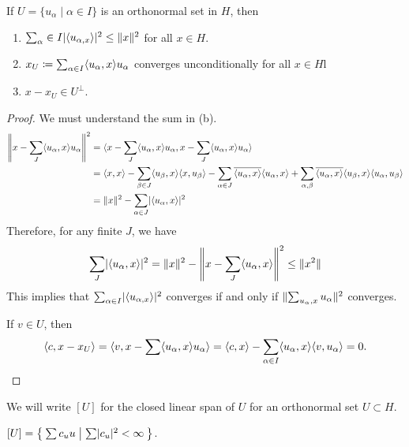 \documentclass[10pt, twoside]{article}
\begin{document}
    \begin{thm}[Bessel] If $U = \{u_{\alpha} \mid \alpha \in I\}$ is an
        orthonormal set in $H$, then \begin{enumerate}[label=(\alph*)] \item
            $\sum_{\alpha }\in I \abs{\gen{u_{\alpha,x}}}^2 \leq \norm{x}^2$
            for all $x \in H$.  \item $x_U \coloneqq \sum_{\alpha \in I}
            \gen{u_{\alpha},x} u_{\alpha}$ converges unconditionally for all $x
            \in H$l \item $x-x_U \in U^{\perp}$.  \end{enumerate}

        \begin{proof} We must understand the sum in (b).  \begin{align*}
            \norm*{x-\sum_J \gen{u_{\alpha},x} u_{\alpha}}^2 &= \gen{x-\sum_J
            \gen{u_{\alpha},x} u_{\alpha}, x-\sum_J \gen{u_{\alpha},x}
            u_{\alpha}} \\ &= \gen{x,x} - \sum_{\beta \in J}
            \gen{u_{\beta},x}\gen{x,u_{\beta}} - \sum_{\alpha \in J}
            \overline{\gen{u_{\alpha},x}} \gen{u_{\alpha},x} +
            \sum_{\alpha,\beta}
            \overline{\gen{u_{\alpha},x}}\gen{u_{\beta},x}\gen{u_{\alpha},u_{\beta}}
            \\ &= \norm{x}^2 - \sum_{\alpha \in J} \abs{\gen{u_{\alpha},x}}^2
            \end{align*} Therefore, for any finite $J$, we have \[\sum_J
        \abs{\gen{u_{\alpha},x}}^2 = \norm{x}^2 - \norm*{x - \sum_J
    \gen{u_{\alpha},x}}^2 \leq \norm{x^2}\] This implies that $\sum_{\alpha \in
I} \abs{\gen{u_{\alpha,x}}}^2 $ converges if and only if
$\norm{\sum_{u_{\alpha},x}u_{\alpha}}^2$ converges.

            If $v \in U$, then \[\gen{c,x-x_U} = \gen{v,x - \sum
            \gen{u_{\alpha},x} u_{\alpha}} = \gen{c,x} - \sum_{\alpha \in I}
        \gen{u_{\alpha},x} \gen{v,u_{\alpha}} = 0. \] \end{proof} \end{thm}
    
    We will write $[U]$ for the closed linear span of $U$ for an orthonormal
    set $U \subset H$.

    \begin{thm} $[U] = \Set{ \sum c_u u | \sum \abs{c_u}^2 < \infty }$.
    \end{thm}
\end{document}

